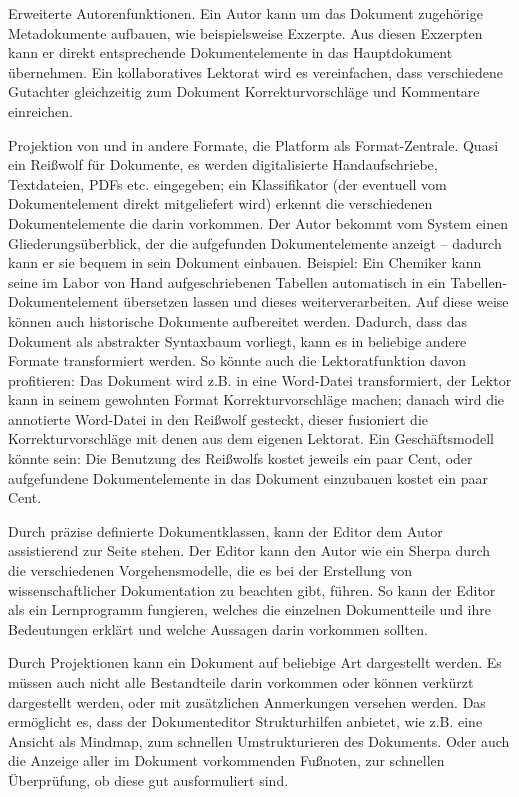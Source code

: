  
Erweiterte Autorenfunktionen. Ein Autor kann um das Dokument zugehörige Metadokumente aufbauen, wie beispielsweise Exzerpte. Aus diesen Exzerpten kann er direkt entsprechende Dokumentelemente in das Hauptdokument übernehmen. Ein kollaboratives Lektorat wird es vereinfachen, dass verschiedene Gutachter gleichzeitig zum Dokument Korrekturvorschläge und Kommentare einreichen.

 
Projektion von und in andere Formate, die Platform als Format-Zentrale. Quasi ein Reißwolf für Dokumente, es werden digitalisierte Handaufschriebe, Textdateien, PDFs etc. eingegeben; ein Klassifikator (der eventuell vom Dokumentelement direkt mitgeliefert wird) erkennt die verschiedenen Dokumentelemente die darin vorkommen. Der Autor bekommt vom System einen Gliederungsüberblick, der die aufgefunden Dokumentelemente anzeigt -- dadurch kann er sie bequem in sein Dokument einbauen. Beispiel: Ein Chemiker kann seine im Labor von Hand aufgeschriebenen Tabellen automatisch in ein Tabellen-Dokumentelement übersetzen lassen und dieses weiterverarbeiten. Auf diese weise können auch historische Dokumente aufbereitet werden. Dadurch, dass das Dokument als abstrakter Syntaxbaum vorliegt, kann es in beliebige andere Formate transformiert werden. So könnte auch die Lektoratfunktion davon profitieren: Das Dokument wird z.B. in eine Word-Datei transformiert, der Lektor kann in seinem gewohnten Format Korrekturvorschläge machen; danach wird die annotierte Word-Datei in den Reißwolf gesteckt, dieser fusioniert die Korrekturvorschläge mit denen aus dem eigenen Lektorat. Ein Geschäftsmodell könnte sein: Die Benutzung des Reißwolfs kostet jeweils ein paar Cent, oder aufgefundene Dokumentelemente in das Dokument einzubauen kostet ein paar Cent.

 
Durch präzise definierte Dokumentklassen, kann der Editor dem Autor assistierend zur Seite stehen. Der Editor kann den Autor wie ein Sherpa durch die verschiedenen Vorgehensmodelle, die es bei der Erstellung von wissenschaftlicher Dokumentation zu beachten gibt, führen. So kann der Editor als ein Lernprogramm fungieren, welches die einzelnen Dokumentteile und ihre Bedeutungen erklärt und welche Aussagen darin vorkommen sollten.

 
Durch Projektionen kann ein Dokument auf beliebige Art dargestellt werden. Es müssen auch nicht alle Bestandteile darin vorkommen oder können verkürzt dargestellt werden, oder mit zusätzlichen Anmerkungen versehen werden. Das ermöglicht es, dass der Dokumenteditor Strukturhilfen anbietet, wie z.B. eine Ansicht als Mindmap, zum schnellen Umstrukturieren des Dokuments. Oder auch die Anzeige aller im Dokument vorkommenden Fußnoten, zur schnellen Überprüfung, ob diese gut ausformuliert sind.

